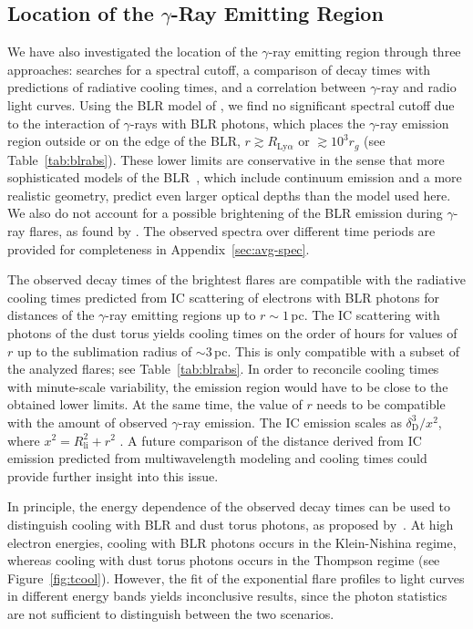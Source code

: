 \documentclass[twocolumn]{aastex62}
\newcommand{\Grays}{$\gamma$-rays\xspace}
\newcommand{\gray}{$\gamma$-ray\xspace}
\begin{document}
\subsection{Location of the $\gamma$-Ray Emitting Region}
We have also investigated the location of the \gray emitting region  through three approaches: searches for a spectral cutoff, a comparison of decay times with predictions of radiative cooling times, and a correlation between \gray and radio light curves. 
Using the BLR model of \citet{finke2016}, we find no significant spectral cutoff due to the interaction of \Grays with BLR photons, which places the \gray emission region outside or on the edge of the BLR, $r \gtrsim R_{\mathrm{Ly}\alpha}$ or $\gtrsim 10^3r_g$ (see Table~\ref{tab:blrabs}). 
These lower limits are conservative in the sense that more sophisticated models of the BLR~\citep[e.g.,][]{2017MNRAS.464..152A}, which include continuum emission and a more realistic geometry, predict even larger optical depths than the model used here.
We also do not account for a possible brightening of the BLR emission during \gray flares, as found by \citet{2013ApJ...763L..36L}.
The observed spectra over different time periods are provided for completeness in Appendix~\ref{sec:avg-spec}.

The observed decay times of the brightest flares are compatible with the radiative cooling times predicted from IC scattering of electrons with BLR photons for distances of the \gray emitting regions up to $r\sim 1\,$pc. 
The IC scattering with photons of the dust torus yields cooling times on the order of hours for values of $r$ up to the sublimation radius of $\sim 3\,$pc. 
This is only compatible with a subset of the analyzed flares; see Table~\ref{tab:blrabs}.
In order to reconcile cooling times with minute-scale variability, the emission region would have to be close to the obtained lower limits. 
At the same time, the value of $r$ needs to be compatible with the amount of observed \gray emission. The IC emission scales as $\delta_\mathrm{D}^3 / x^2$, where $x^2 = R_\mathrm{li}^2 + r^2$ \citep[see, e.g., Equation (87) in][]{finke2016}. 
A future comparison of the distance derived from IC emission predicted from multi\-wavelength modeling and cooling times could provide further insight into this issue.

In principle, the energy dependence of the observed decay times can be used to distinguish cooling with BLR and dust torus photons, as proposed by~\citet{2012ApJ...758L..15D}. 
At high electron energies, cooling with BLR photons occurs in the Klein-Nishina regime, whereas cooling with dust torus photons occurs in the Thompson regime (see Figure~\ref{fig:tcool}).
However, the fit of the exponential flare profiles to light curves in different energy bands yields inconclusive results, since the photon statistics are not sufficient to distinguish between the two scenarios.
\end{document}
